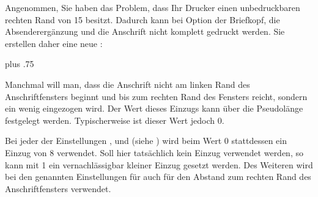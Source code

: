 \begin{Example}
  Angenommen, Sie haben das Problem, dass Ihr Drucker einen unbedruckbaren rechten Rand von
  15 besitzt. Dadurch kann bei Option  der Briefkopf, die
  Absenderergänzung und die Anschrift nicht komplett gedruckt werden. Sie
  erstellen daher eine neue :
%
\end{Example}
%
\EndIndexGroup
{}\ht\strutbox plus .75\strutbox %


\begin{Declaration}
\end{Declaration}
Manchmal will man, dass die Anschrift nicht am linken Rand des
Anschriftfensters beginnt und bis zum rechten Rand des Fensters reicht,
sondern ein wenig eingezogen wird. Der Wert dieses Einzugs kann über die
Pseudolänge  festgelegt
werden. Typischerweise ist dieser Wert jedoch
0.

Bei jeder der
Einstellungen
,
%
 und
%
 (siehe
) wird beim Wert 0
stattdessen ein Einzug von 8 verwendet. Soll hier tatsächlich kein
Einzug verwendet werden, so kann mit 1 ein vernachlässigbar kleiner
Einzug gesetzt werden. Des Weiteren wird  bei den
genannten Einstellungen für
 auch für den
Abstand zum rechten Rand des Anschriftfensters verwendet.%
\EndIndexGroup


